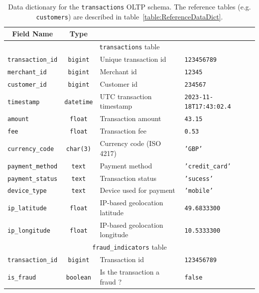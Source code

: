 \documentclass[11pt,a4paper,computermodern]{article}
\newcommand{\code}{\texttt}
\begin{document}
\begin{table}[!htb]
	\centering
	\begin{threeparttable}
		\caption{Data dictionary for the \code{transactions} OLTP schema. The reference tables (e.g. \code{customers}) are described in table~\ref{table:ReferenceDataDict}.}
		\label{table:OLTPDataDict}
		\begin{tabularx}{0.99\textwidth}{l c >{\arraybackslash}X >{\arraybackslash}X}
			\toprule
			\multicolumn{1}{c}{\textbf{Field Name}} & \multicolumn{1}{c}{\textbf{Type}} & \multicolumn{1}{c}{\textbf{Description}} & \multicolumn{1}{c}{\textbf{Example}} \\
			\midrule
			\multicolumn{4}{c}{\code{transactions} table}\\
			\code{transaction\_id} & \code{bigint} & Unique transaction id & \code{123456789} \\
			\code{merchant\_id} & \code{bigint} & Merchant id & \code{12345} \\
			\code{customer\_id} & \code{bigint} & Customer id & \code{234567} \\
			\code{timestamp} & \code{datetime} & UTC transaction timestamp & \code{2023-11-18T17:43:02.4} \\
			\code{amount} & \code{float} & Transaction amount & \code{43.15} \\
			\code{fee} & \code{float} & Transaction fee & \code{0.53} \\
			\code{currency\_code} & \code{char(3)} & Currency code (ISO 4217) & \code{'GBP'} \\
			\code{payment\_method} & \code{text} & Payment method & \code{'credit\_card'} \\
			\code{payment\_status} & \code{text} & Transaction status & \code{'sucess'} \\
			\code{device\_type} & \code{text} & Device used for payment & \code{'mobile'} \\
			\code{ip\_latitude} & \code{float} & IP-based geolocation latitude & \code{49.6833300} \\
			\code{ip\_longitude} & \code{float} & IP-based geolocation longitude & \code{10.5333300} \\
			
			\midrule
			\multicolumn{4}{c}{\code{fraud\_indicators} table}\\
			\code{transaction\_id} & \code{bigint} & Transaction id & \code{123456789} \\
			\code{is\_fraud} & \code{boolean} & Is the transaction a fraud ? & \code{false} \\
			\bottomrule
		\end{tabularx}
	\end{threeparttable}
\end{table}
\end{document}
